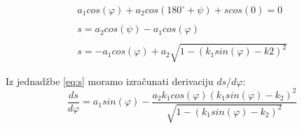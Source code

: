 \begin{gather}
a_1cos(\varphi)+a_2cos(180^\circ+\psi)+scos(0)=0\\
\nonumber \\
s = a_2cos(\psi)-a_1cos(\varphi)\\
\nonumber \\
\label{eq:s}
s = -a_1cos(\varphi)+a_2\sqrt{1-(k_1sin(\varphi)-k2)^2}
\end{gather}

Iz jednadžbe \ref{eq:s} moramo izračunati derivaciju $ds/d\varphi$:
\begin{equation}
\label{eq:dsdfi}
\dfrac{ds}{d\varphi}=a_1sin(\varphi) - \dfrac{a_2k_1cos(\varphi)\left( k_1sin(\varphi)-k_2\right) ^2}{\sqrt{1-(k_1sin(\varphi)-k_2)^2}}
\end{equation}






